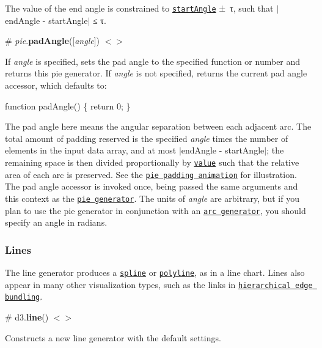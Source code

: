 The value of the end angle is constrained to \href{#pie_startAngle}{\tt start\+Angle} ± τ, such that $\vert$end\+Angle -\/ start\+Angle$\vert$ ≤ τ.

\label{_pie_padAngle}%
\# {\itshape pie}.{\bfseries pad\+Angle}(\mbox{[}{\itshape angle}\mbox{]}) \href{https://github.com/d3/d3-shape/blob/master/src/pie.js#L74}{\tt $<$$>$}

If {\itshape angle} is specified, sets the pad angle to the specified function or number and returns this pie generator. If {\itshape angle} is not specified, returns the current pad angle accessor, which defaults to\+:


\begin{DoxyCode}
function padAngle() \{
  return 0;
\}
\end{DoxyCode}


The pad angle here means the angular separation between each adjacent arc. The total amount of padding reserved is the specified {\itshape angle} times the number of elements in the input data array, and at most $\vert$end\+Angle -\/ start\+Angle$\vert$; the remaining space is then divided proportionally by \href{#pie_value}{\tt value} such that the relative area of each arc is preserved. See the \href{http://bl.ocks.org/mbostock/3e961b4c97a1b543fff2}{\tt pie padding animation} for illustration. The pad angle accessor is invoked once, being passed the same arguments and {\ttfamily this} context as the \href{#_pie}{\tt pie generator}. The units of {\itshape angle} are arbitrary, but if you plan to use the pie generator in conjunction with an \href{#arcs}{\tt arc generator}, you should specify an angle in radians.

\subsubsection*{Lines}

\href{http://bl.ocks.org/mbostock/1550e57e12e73b86ad9e}{\tt }

The line generator produces a \href{https://en.wikipedia.org/wiki/Spline_\(mathematics\)}{\tt spline} or \href{https://en.wikipedia.org/wiki/Polygonal_chain}{\tt polyline}, as in a line chart. Lines also appear in many other visualization types, such as the links in \href{http://bl.ocks.org/mbostock/7607999}{\tt hierarchical edge bundling}.

\label{_line}%
\# d3.{\bfseries line}() \href{https://github.com/d3/d3-shape/blob/master/src/line.js}{\tt $<$$>$}

Constructs a new line generator with the default settings.

